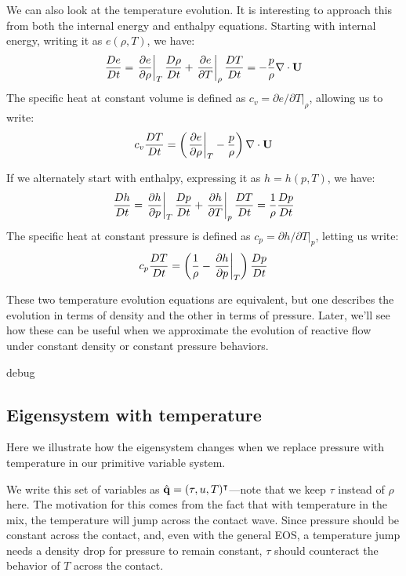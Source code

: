 We can also look at the temperature evolution.  It is interesting to
approach this from both the internal energy and enthalpy equations.
Starting with internal energy, writing it as $e(\rho, T)$, we have:
\begin{equation}
{\frac{{De}}{D t}} = \left . \frac{\partial e}{\partial \rho} \right |_T {\frac{{D\rho}}{D t}} +
          \left . \frac{\partial e}{\partial T} \right |_\rho {\frac{{DT}}{D t}} = -\frac{p}{\rho} \nabla \cdot {\bf U}
\end{equation}
The specific heat at constant volume is defined as $c_v = \partial
e/\partial T|_\rho$, allowing us to write:
\begin{equation}
c_v {\frac{{DT}}{D t}} = \left ( \left . \frac{\partial e}{\partial \rho} \right |_T - \frac{p}{\rho} \right ) \nabla \cdot {\bf U}
\end{equation}

If we alternately start with enthalpy, expressing it as $h = h(p, T)$,
we have:
\begin{equation}
{\frac{{Dh}}{D t}} = \left . \frac{\partial h}{\partial p} \right |_T {\frac{{Dp}}{D t}} +
          \left . \frac{\partial h}{\partial T} \right |_p {\frac{{DT}}{D t}} = \frac{1}{\rho} {\frac{{Dp}}{D t}}
\end{equation}
The specific heat at constant pressure is defined as $c_p = \partial
h/\partial T|_p$, letting us write:
\begin{equation}
c_p {\frac{{DT}}{D t}} = \left ( \frac{1}{\rho} - \left . \frac{\partial h}{\partial p} \right |_T \right ) {\frac{{Dp}}{D t}}
\end{equation}

These two temperature evolution equations are equivalent, but one
describes the evolution in terms of density and the other in terms of
pressure.  Later, we'll see how these can be useful when we
approximate the evolution of reactive flow under constant density or
constant pressure behaviors.

\if debug
\subsection{Eigensystem with temperature}

Here we illustrate how the eigensystem changes when we replace pressure with
temperature in our primitive variable system.

We write this set of variables as $\hat{{\bf q}} = (\tau, u,
T)^\intercal$---note that we keep $\tau$ instead of $\rho$ here.  The
motivation for this comes from the fact that with temperature in the
mix, the temperature will jump across the contact wave.  Since
pressure should be constant across the contact, and, even with the
general EOS, a temperature jump needs a density drop for pressure to
remain constant, $\tau$ should counteract the behavior of $T$ across
the contact.

